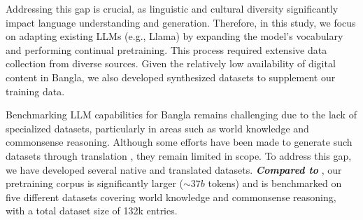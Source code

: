 Addressing this gap is crucial, as linguistic and cultural diversity significantly impact language understanding and generation. Therefore, in this study, we focus on adapting existing LLMs (e.g., Llama) by expanding the model's vocabulary and performing continual pretraining. This process required extensive data collection from diverse sources. Given the relatively low availability of digital content in Bangla, we also developed synthesized datasets to supplement our training data.

Benchmarking LLM capabilities for Bangla remains challenging due to the lack of specialized datasets, particularly in areas such as world knowledge and commonsense reasoning. Although some efforts have been made to generate such datasets through translation \cite{lai-etal-2023-okapi}, they remain limited in scope. To address this gap, we have developed several native and translated datasets. \textbf{\textit{Compared to }}\citet{zehady2024bongllama}, our pretraining corpus is significantly larger ($\sim37b$ tokens) and is benchmarked on five different datasets covering world knowledge and commonsense reasoning, with a total dataset size of 132k entries.




